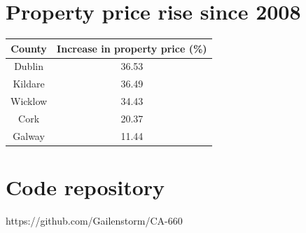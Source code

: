 \documentclass[twocolumn]{article}
\begin{document}
\section{Property price rise since 2008}
\begin{tabular}{||c c||}
 \hline
 County & Increase in property price (\%) \\ [0.5ex]
 \hline\hline
 Dublin & 36.53 \\
 \hline
 Kildare & 36.49 \\
 \hline
 Wicklow & 34.43 \\
 \hline
 Cork & 20.37 \\
 \hline
 Galway & 11.44 \\ [1ex]
 \hline
\end{tabular}
\section{Code repository}
https://github.com/Gailenstorm/CA-660
\end{document}
